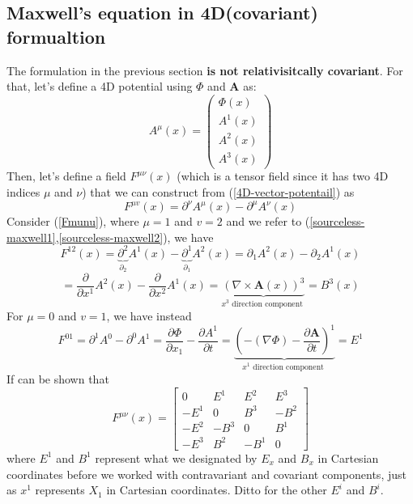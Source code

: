 \subsection{Maxwell's equation in 4D(covariant) formualtion}
The formulation in the previous section \textbf{is not relativisitcally covariant}. For that, let's define a 4D potential using $\Phi$ and $\mathbf{A}$ as:
\begin{equation}
A^{\mu}(x)=\left(\begin{array}{c}
{\Phi(x)} \\
{A^{1}(x)} \\
{A^{2}(x)} \\
{A^{3}(x)}
\end{array}\right)
\label{4D-vector-potentail}
\end{equation}
Then, let's define a field $F^{\mu \nu}(x)$ (which is a tensor field since it has two 4D indices $\mu$ and $\nu$) that we can construct from (\ref{4D-vector-potentail}) as
\begin{equation}
F^{\mu v}(x)=\partial^{\nu} A^{\mu}(x)-\partial^{\mu} A^{\nu}(x)
\label{Fmunu}
\end{equation}
Consider (\ref{Fmunu}), where $\mu=1$ and $v=2$ and we refer to (\ref{sourceless-maxwell1},\ref{sourceless-maxwell2}), we have
$$
F^{12}(x)=\underbrace{\partial^{2}}_{\partial_{2}} A^{1}(x)-\underbrace{\partial^{1}}_{\partial_{1}} A^{2}(x)=\partial_{1} A^{2}(x)-\partial_{2} A^{1}(x)
$$
$$
=\frac{\partial}{\partial x^{1}} A^{2}(x)-\frac{\partial}{\partial x^{2}} A^{1}(x)=\underbrace{(\nabla \times \mathbf{A}(x))^{3}}_{x^{3} \text { direction component }}=B^3(x)
$$
For $\mu=0$ and $v=1$, we have instead
$$
F^{01}=\partial^{1} A^{0}-\partial^{0} A^{1}=\frac{\partial \Phi}{\partial x_{1}}-\frac{\partial A^{1}}{\partial t}=\underbrace{\left(-(\nabla \Phi)-\frac{\partial \mathbf{A}}{\partial t}\right)^{1}}_{x^1{\text { direction component }}}=E^{1}
$$
If can be shown that
\begin{equation}
F^{\mu \nu}(x)=\left[\begin{array}{cccc}
{0} & {E^{1}} & {E^{2}} & {E^{3}} \\
{-E^{1}} & {0} & {B^{3}} & {-B^{2}} \\
{-E^{2}} & {-B^{3}} & {0} & {B^{1}} \\
{-E^{3}} & {B^{2}} & {-B^{1}} & {0}
\end{array}\right]
\end{equation}
where $E^{1}$ and $B^{1}$ represent what we designated by $E_{x}$ and $B_{x}$ in Cartesian coordinates before we worked with contravariant and covariant components, just as $x^{1}$ represents $X_{1}$ in Cartesian coordinates. Ditto for the other $E^{i}$ and $B^{i}$.

